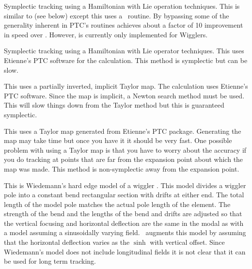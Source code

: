 \begin{description}
\item[\vn{Symp\_Lie\_Bmad}]
Symplectic tracking using a Hamiltonian with Lie operation techniques.
This is similar to  (see below) except this uses a
\bmad\ routine. By bypassing some of the generality inherent in PTC's routines
 achieves about a factor of 10 improvement in speed over
. However,  is
currently only implemented for Wigglers.

\item[\vn{Symp\_Lie\_PTC}]
Symplectic tracking using a Hamiltonian with Lie operator techniques.
This uses Etienne's PTC software for the calculation. This method is
symplectic but can be slow.

\item[\vn{Symp\_Map}]
This uses a partially inverted, implicit Taylor map. The calculation
uses Etienne's PTC software.  Since the map is implicit, a Newton
search method must be used. This will slow things down from the Taylor
method but this is guaranteed symplectic.

\item[\vn{Taylor}]
This uses a Taylor map generated from Etienne's PTC
package. Generating the map may take time but once you have it it
should be very fast. One possible problem with using a Taylor map is
that you have to worry about the accuracy if you do tracking at points
that are far from the expansion point about which the map was
made. This method is non-symplectic away from the expansion point. 

\item[\vn{Wiedemann}]
This is Wiedemann's hard edge model of a wiggler
\cite{wiedemann}. This model divides a wiggler pole into a constant 
bend rectangular section with drifts at either end. The total length
of the model pole matches the actual pole length of the element. The
strength of the bend and the lengths of the bend and drifts are
adjusted so that the vertical focusing and horizontal deflection are
the same in the modal as with a model assuming a sinusoidally varying
field. \bmad\ augments this model by assuming that the horizontal
deflection varies as the $\sinh$ with vertical offset.  Since
Wiedemann's model does not include longitudinal fields it is not clear
that it can be used for long term tracking.

\end{description}

